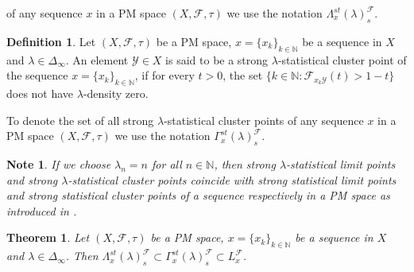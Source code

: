 \documentclass[reqno,b5paper]{amsart}
\theoremstyle{plain}
\newtheorem{thm}{Theorem}[section]
\newtheorem{note}{Note}[section]
\theoremstyle{definition}
\newtheorem{defn}{Definition}[section]
\begin{document}
of any sequence $x$ in a PM space $(X,\mathcal{F},\tau)$ we use
the notation $\Lambda_x^{st}(\lambda)^\mathcal{F}_{s}$.
\begin{defn}
Let $(X,\mathcal{F},\tau)$ be a PM space, $x=\{x_k\}_{k
\in\mathbb{N}}$ be a sequence in $X$ and
$\lambda\in\Delta_\infty$. An element $\mathcal{Y}\in X$ is said
to be a strong $\lambda$-statistical cluster point of the sequence
$x=\{x_k\}_{k\in\mathbb N}$, if for every $t>0$, the set $\{k
\in\mathbb N : \mathcal{F}_{x_k\mathcal{Y}}(t)>1-t \}$ does not
have $\lambda$-density zero.
\end{defn}
To denote the set of all strong $\lambda$-statistical cluster
points of any sequence $x$ in a PM space $(X,\mathcal{F},\tau)$ we
use the notation $\Gamma_x^{st}(\lambda)^\mathcal{F}_{s}$.
\begin{note}
If we choose $\lambda_n=n$ for all $n\in\mathbb{N}$, then strong
$\lambda$-statistical limit points and strong
$\lambda$-statistical cluster points coincide with strong
statistical limit points and strong statistical cluster points of
a sequence respectively in a PM space as introduced in \cite{Se}.
\end{note}
\begin{thm}
Let $(X,\mathcal{F},\tau)$ be a PM space, $x=\{x_k\}_{k
\in\mathbb{N}}$ be a sequence in $X$ and
$\lambda\in\Delta_\infty$. Then
$\Lambda_x^{st}(\lambda)^\mathcal{F}_{s} \subset
\Gamma_x^{st}(\lambda)^\mathcal{F}_{s}\subset L_x^\mathcal{F}$.
\end{thm}
\end{document}
